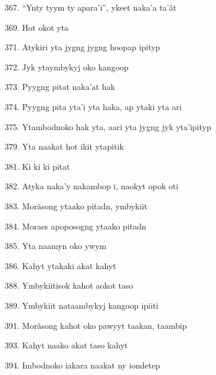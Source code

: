 367. ``Ynty tyym ty apara'i'', ykeet naka'a ta'ãt

369. Hot okot yta

371. Atykiri yta jygng jygng hoopap ipityp

372. Jyk ytaymbykyj oko kangoop

373. Pyygng pitat naka'at hak

374. Pyygng pita yta'i yta haka, ap ytaki yta ari

375. Ytambodnoko hak yta, aari yta jygng jyk yta'ipityp

379. Yta naakat hot ikit ytapitik

381. Ki ki ki pitat

382. Atyka naka'y nakambop i, naokyt opok oti

383. Morãsong ytaako pitadn, ymbykiit

384. Moraes apoposogng ytaako pitadn

385. Yta naamyn oko ywym

386. Kahyt ytakaki akat kahyt

388. Ymbykiitisok kahot aokot taso

389. Ymbykiit nataambykyj kangoop ipiiti

391. Morãsong kahot oko pawyyt taakan, taambip

393. Kahyt naako akat taso kahyt

394. Imbodnoko iakara naakat ny iondetep